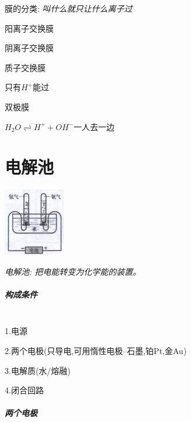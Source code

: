 \documentclass[10pt,cn]{elegantbook}
\begin{document}
膜的分类:
 \textit{叫什么就只让什么离子过}

阳离子交换膜%

阴离子交换膜

质子交换膜

只有$H^{+}$能过

双极膜

$H_{2}O\rightleftharpoons H^{+}+OH^{-}$一人去一边

\chapter{电解池}


\begin{center}
	\includegraphics[max width=0.2\textwidth]{image/c19.jpg}
\end{center}



\textit{电解池: 把电能转变为化学能的装置。}

\paragraph{构成条件}~{}\\

1.电源

2.两个电极(只导电,可用惰性电极--石墨,铂Pt,金Au)

3.电解质(水/熔融)

4.闭合回路

\paragraph{两个电极}~{}\\
\end{document}
